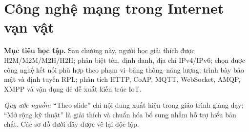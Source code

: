 \chapter{Công nghệ mạng trong Internet vạn vật}
\label{ch:network}
\begin{keybox}
\textbf{Mục tiêu học tập.} Sau chương này, người học giải thích được H2M/M2M/M2H/H2H; phân biệt tên, định danh, địa chỉ IPv4/IPv6; chọn được công nghệ kết nối phù hợp theo phạm vi--băng thông--năng lượng; trình bày bảo mật và định tuyến RPL; phân tích HTTP, CoAP, MQTT, WebSocket, AMQP, XMPP và vận dụng để đề xuất kiến trúc IoT.
\end{keybox}
\noindent\textit{Quy ước nguồn:} ``Theo slide'' chỉ nội dung xuất hiện trong giáo trình giảng dạy; ``Mở rộng kỹ thuật'' là giải thích và chuẩn hóa bổ sung nhằm hỗ trợ hiểu bản chất. Các sơ đồ dưới đây được vẽ lại độc lập.





